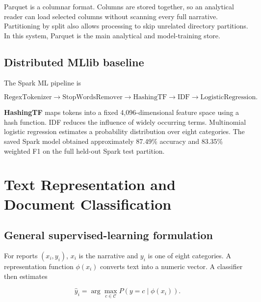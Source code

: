 \documentclass[12pt,a4paper]{report}
\begin{document}
Parquet is a columnar format. Columns are stored together, so an analytical reader can load selected columns without scanning every full narrative. Partitioning by split also allows processing to skip unrelated directory partitions. In this system, Parquet is the main analytical and model-training store.

\section{Distributed MLlib baseline}

The Spark ML pipeline is

\begin{equation}
\text{RegexTokenizer}
\rightarrow\text{StopWordsRemover}
\rightarrow\text{HashingTF}
\rightarrow\text{IDF}
\rightarrow\text{LogisticRegression}.
\end{equation}

\textbf{HashingTF} maps tokens into a fixed 4,096-dimensional feature space using a hash function. IDF reduces the influence of widely occurring terms. Multinomial logistic regression estimates a probability distribution over eight categories. The saved Spark model obtained approximately 87.49\% accuracy and 83.35\% weighted F1 on the full held-out Spark test partition.

\chapter{Text Representation and Document Classification}

\section{General supervised-learning formulation}

For reports $(x_i,y_i)$, $x_i$ is the narrative and $y_i$ is one of eight categories. A representation function $\phi(x_i)$ converts text into a numeric vector. A classifier then estimates

\begin{equation}
\hat{y}_i=\arg\max_{c\in\mathcal{C}} P(y=c\mid\phi(x_i)).
\end{equation}
\end{document}
